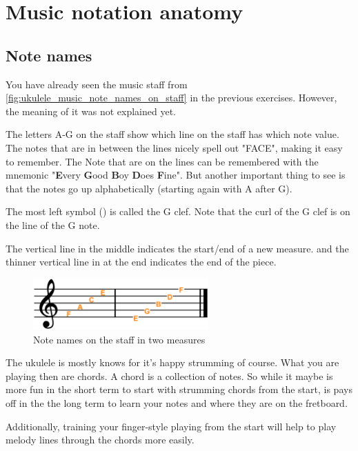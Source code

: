 \section{Music notation anatomy}

\subsection{Note names}

You have already seen the music staff from \autoref{fig:ukulele_music_note_names_on_staff} in the previous exercises. However, the meaning of it was not explained yet.

The letters A-G on the staff show which line on the staff has which note value. The notes that are in between the lines nicely spell out "FACE", making it easy to remember. The Note that are on the lines can be remembered with the mnemonic "\textbf{E}very \textbf{G}ood \textbf{B}oy \textbf{D}oes \textbf{F}ine". But another important thing to see is that the notes go up alphabetically (starting again with A after G). 

The most left symbol (\clefG) is called the G clef. Note that the curl of the G clef is on the line of the G note. 

The vertical line in the middle indicates the start/end of a new measure. and the thinner vertical line in at the end indicates the end of the piece.

\begin{figure}[h]
	\centering
	\includegraphics[width=0.6\textwidth]{../../Images/MusicNotation_MeasureNoteNames.png}
	\caption{Note names on the staff in two measures}
	\label{fig:ukulele_music_note_names_on_staff}
\end{figure}

The ukulele is mostly knows for it's happy strumming of course. What you are playing then are chords. A chord is a collection of notes. So while it maybe is more fun in the short term to start with strumming chords from the start, is pays off in the the long term to learn your notes and where they are on the fretboard.

Additionally, training your finger-style playing from the start will help to play melody lines through the chords more easily.

